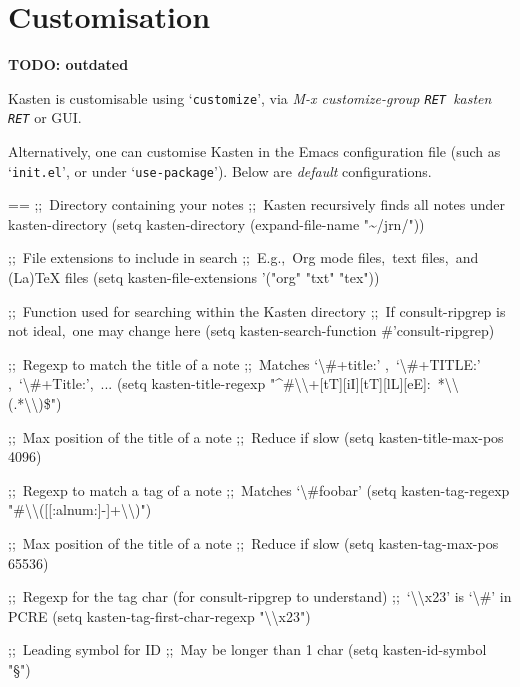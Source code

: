 \documentclass{book}
\makeatletter
\newcommand\Texinfocommandstyletextkbd[1]{{\ttfamily\textsl{#1}}}%
\newenvironment{Texinfopreformatted}{%
  \par\GNUTobeylines\obeyspaces\frenchspacing\parskip=\z@\parindent=\z@}{}
{\catcode`\^^M=13 \gdef\GNUTobeylines{\catcode`\^^M=13 \def^^M{\null\par}}}
\newenvironment{Texinfoindented}{\begin{list}{}{}\item\relax}{\end{list}}
\renewcommand{\_}{\Texinfounderscore\discretionary{}{}{}}
\makeatother
\begin{document}
\chapter{{Customisation}}
\label{anchor:Customisation}%

\textbf{TODO: outdated}

Kasten is customisable using `\texttt{customize}', via \Texinfocommandstyletextkbd{M-x customize-group \texttt{RET}\ kasten \texttt{RET}} or GUI\@.

Alternatively, one can customise Kasten in the Emacs configuration file (such as
`\texttt{init.el}', or under `\texttt{use-package}'). Below are \emph{default} configurations.

\begin{Texinfoindented}
\begin{Texinfopreformatted}%
\ttfamily ;;\ Directory containing your notes
;;\ Kasten recursively finds all notes under kasten-directory
(setq kasten-directory (expand-file-name "\~{}/jrn/"))

;;\ File extensions to include in search
;;\ E.g.,\ Org mode files,\ text files,\ and (La)TeX files
(setq kasten-file-extensions '("org" "txt" "tex"))

;;\ Function used for searching within the Kasten directory
;;\ If consult-ripgrep is not ideal,\ one may change here
(setq kasten-search-function \#'consult-ripgrep)

;;\ Regexp to match the title of a note
;;\ Matches `\textbackslash{}\#+title:' ,\ `\textbackslash{}\#+TITLE:' ,\ `\textbackslash{}\#+Title:',\ ...
(setq kasten-title-regexp "\^{}\#\textbackslash{}\textbackslash{}+[tT][iI][tT][lL][eE]:\ *\textbackslash{}\textbackslash{}(.*\textbackslash{}\textbackslash{})\$")

;;\ Max position of the title of a note
;;\ Reduce if slow
(setq kasten-title-max-pos 4096)

;;\ Regexp to match a tag of a note
;;\ Matches `\textbackslash{}\#foobar'
(setq kasten-tag-regexp "\#\textbackslash{}\textbackslash{}([[:alnum:]\_-]+\textbackslash{}\textbackslash{})")

;;\ Max position of the title of a note
;;\ Reduce if slow
(setq kasten-tag-max-pos 65536)

;;\ Regexp for the tag char (for consult-ripgrep to understand)
;;\ `\textbackslash{}\textbackslash{}x23' is `\textbackslash{}\#' in PCRE
(setq kasten-tag-first-char-regexp "\textbackslash{}\textbackslash{}x23")

;;\ Leading symbol for ID
;;\ May be longer than 1 char
(setq kasten-id-symbol "§")


\end{Texinfopreformatted}
\end{Texinfoindented}
\end{document}
